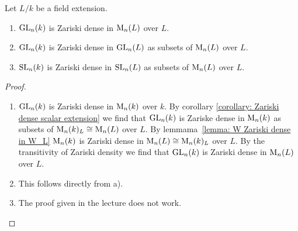 \begin{proposition}
  Let $L/k$ be a field extension.
  \begin{enumerate}[label=\emph{\alph*)},leftmargin=*]
    \item
      $\operatorname{GL}_n(k)$ is Zariski dense in $\operatorname{M}_n(L)$ over $L$.
    \item
      $\operatorname{GL}_n(k)$ is Zariski dense in $\operatorname{GL}_n(L)$ as subsets of $\operatorname{M}_n(L)$ over $L$.
    \item
      $\operatorname{SL}_n(k)$ is Zariski dense in $\operatorname{SL}_n(L)$ as subsets of $\operatorname{M}_n(L)$ over $L$.
  \end{enumerate}
\end{proposition}
\begin{proof}
  \begin{enumerate}[label=\emph{\alph*)},leftmargin=*]
    \item
      $\operatorname{GL}_n(k)$ is Zariski dense in $\operatorname{M}_n(k)$ over $k$.
      By corollary \ref{corollary: Zariski dense scalar extension} we find that $\operatorname{GL}_n(k)$ is Zariske dense in $\operatorname{M}_n(k)$ as subsets of $\operatorname{M}_n(k)_L \cong \operatorname{M}_n(L)$ over $L$.
      By \mbox{lemmama \ref{lemma: W Zariski dense in W_L}} $\operatorname{M}_n(k)$ is Zariski dense in $\operatorname{M}_n(L) \cong \operatorname{M}_n(k)_L$ over $L$.
      By the transitivity of Zariski density we find that $\operatorname{GL}_n(k)$ is Zariski dense in $\operatorname{M}_n(L)$ over $L$.
    \item
      This follows directly from a).
    \item
      The proof given in the lecture does not work.
    \qedhere
  \end{enumerate}
\end{proof}


